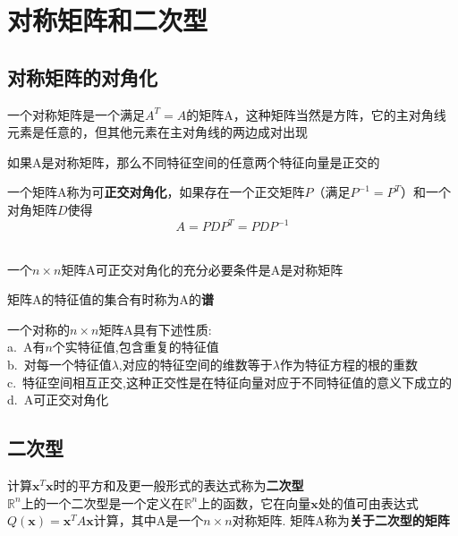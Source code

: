 \chapter{对称矩阵和二次型}
\section{对称矩阵的对角化}
一个对称矩阵是一个满足$A^T=A$的矩阵A，这种矩阵当然是方阵，它的主对角线元素是任意的，但其他元素在主对角线的两边成对出现\\[2ex]

\begin{TheoremOne}
如果A是对称矩阵，那么不同特征空间的任意两个特征向量是正交的
\end{TheoremOne}\vspace{4ex}

一个矩阵A称为可\textbf{正交对角化}，如果存在一个正交矩阵$P$（满足$P^{-1}=P^T$）和一个对角矩阵$D$使得
\[A=PDP^T=PDP^{-1}\]\\[2ex]

\begin{TheoremOne}\label{chap-sev-sec-two:03}
一个$n\times n$矩阵A可正交对角化的充分必要条件是A是对称矩阵
\end{TheoremOne}\vspace{4ex}

矩阵A的特征值的集合有时称为A的\textbf{谱}\\[2ex]

\begin{TheoremTwo}[对称矩阵的谱定理]
一个对称的$n\times n$矩阵A具有下述性质:\\
a.\ A有$n$个实特征值,包含重复的特征值\\
b.\ 对每一个特征值$\lambda$,对应的特征空间的维数等于$\lambda$作为特征方程的根的重数\\
c.\ 特征空间相互正交,这种正交性是在特征向量对应于不同特征值的意义下成立的\\
d.\ A可正交对角化
\end{TheoremTwo}\vspace{4ex}

\section{二次型}
计算$\bm{x}^T\bm{x}$时的平方和及更一般形式的表达式称为\textbf{二次型}\\[2ex]

$\mathbb{R}^n$上的一个二次型是一个定义在$\mathbb{R}^n$上的函数，它在向量$\bm{x}$处的值可由表达式$Q(\bm{x})=\bm{x}^TA\bm{x}$计算，其中A是一个$n\times n$对称矩阵. 矩阵A称为\textbf{关于二次型的矩阵}\\[2ex]

